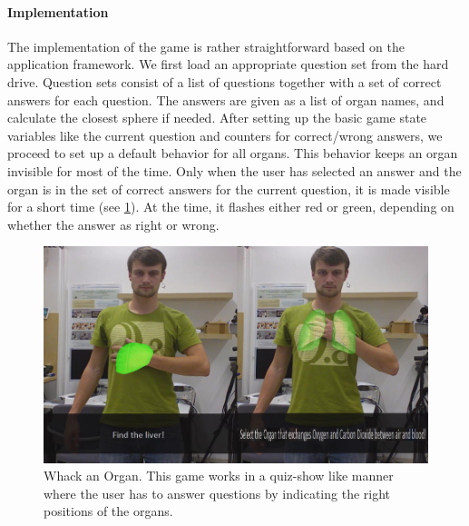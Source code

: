 \paragraph{Implementation}
The implementation of the game is rather straightforward based on the application framework. We first load an appropriate question set from the hard drive. Question sets consist of a list of questions together with a set of correct answers for each question. The answers are given as a list of organ names, and calculate the closest sphere if needed.
After setting up the basic game state variables like the current question and counters for correct/wrong answers, we proceed to set up a default behavior for all organs. This behavior keeps an organ invisible for most of the time. Only when the user has selected an answer and the organ is in the set of correct answers for the current question, it is made visible for a short time (see \figurename{\ref{fig:3-IMR:organGaming}}). At the time, it flashes either red or green, depending on whether the answer as right or wrong.
\begin{figure}
	\centering
	\includegraphics[width=0.7\linewidth]{figures/3-IMR/organGaming}
	\caption{Whack an Organ. This game works in a quiz-show like manner where the user has to answer questions by indicating the right positions of the organs.}
	\label{fig:3-IMR:organGaming}
\end{figure}
